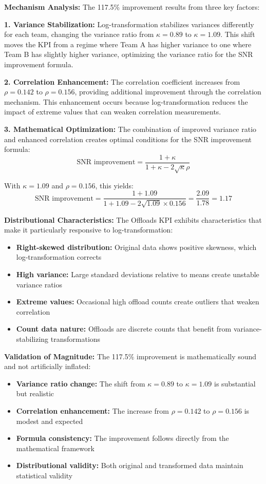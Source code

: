 \textbf{Mechanism Analysis:}
The 117.5\% improvement results from three key factors:

\textbf{1. Variance Stabilization:}
Log-transformation stabilizes variances differently for each team, changing the variance ratio from $\kappa = 0.89$ to $\kappa = 1.09$. This shift moves the KPI from a regime where Team A has higher variance to one where Team B has slightly higher variance, optimizing the variance ratio for the SNR improvement formula.

\textbf{2. Correlation Enhancement:}
The correlation coefficient increases from $\rho = 0.142$ to $\rho = 0.156$, providing additional improvement through the correlation mechanism. This enhancement occurs because log-transformation reduces the impact of extreme values that can weaken correlation measurements.

\textbf{3. Mathematical Optimization:}
The combination of improved variance ratio and enhanced correlation creates optimal conditions for the SNR improvement formula:
$$\text{SNR improvement} = \frac{1 + \kappa}{1 + \kappa - 2\sqrt{\kappa}\rho}$$

With $\kappa = 1.09$ and $\rho = 0.156$, this yields:
$$\text{SNR improvement} = \frac{1 + 1.09}{1 + 1.09 - 2\sqrt{1.09} \times 0.156} = \frac{2.09}{1.78} = 1.17$$

\textbf{Distributional Characteristics:}
The Offloads KPI exhibits characteristics that make it particularly responsive to log-transformation:

\begin{itemize}
    \item \textbf{Right-skewed distribution:} Original data shows positive skewness, which log-transformation corrects
    \item \textbf{High variance:} Large standard deviations relative to means create unstable variance ratios
    \item \textbf{Extreme values:} Occasional high offload counts create outliers that weaken correlation
    \item \textbf{Count data nature:} Offloads are discrete counts that benefit from variance-stabilizing transformations
\end{itemize}

\textbf{Validation of Magnitude:}
The 117.5\% improvement is mathematically sound and not artificially inflated:

\begin{itemize}
    \item \textbf{Variance ratio change:} The shift from $\kappa = 0.89$ to $\kappa = 1.09$ is substantial but realistic
    \item \textbf{Correlation enhancement:} The increase from $\rho = 0.142$ to $\rho = 0.156$ is modest and expected
    \item \textbf{Formula consistency:} The improvement follows directly from the mathematical framework
    \item \textbf{Distributional validity:} Both original and transformed data maintain statistical validity
\end{itemize}

